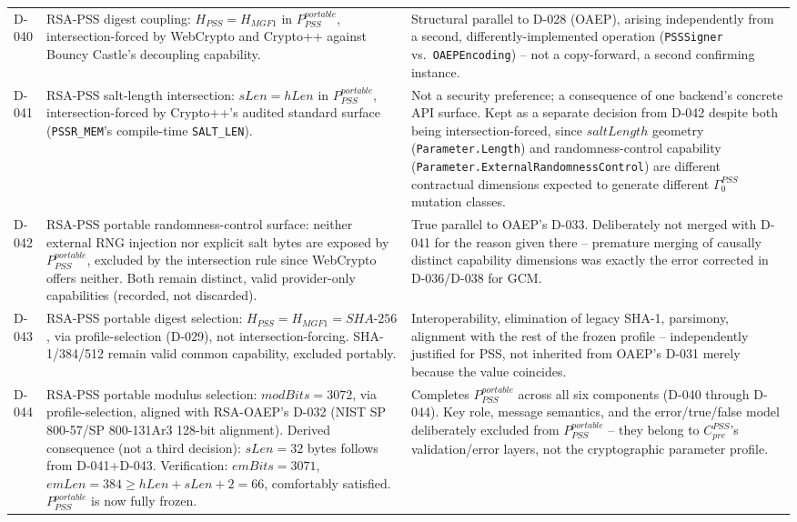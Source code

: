 \documentclass[11pt,a4paper]{article}
\begin{document}
\begin{longtable}{@{}L{0.28\textwidth}L{0.34\textwidth}L{0.30\textwidth}@{}}
D-040 & RSA-PSS digest coupling: $H_{PSS}=H_{MGF1}$ in $P_{PSS}^{portable}$, intersection-forced by WebCrypto and Crypto++ against Bouncy Castle's decoupling capability. & Structural parallel to D-028 (OAEP), arising independently from a second, differently-implemented operation (\texttt{PSSSigner} vs.\ \texttt{OAEPEncoding}) -- not a copy-forward, a second confirming instance.\\
D-041 & RSA-PSS salt-length intersection: $sLen=hLen$ in $P_{PSS}^{portable}$, intersection-forced by Crypto++'s audited standard surface (\texttt{PSSR\_MEM}'s compile-time \texttt{SALT\_LEN}). & Not a security preference; a consequence of one backend's concrete API surface. Kept as a separate decision from D-042 despite both being intersection-forced, since $saltLength$ geometry (\texttt{Parameter.Length}) and randomness-control capability (\texttt{Parameter.ExternalRandomnessControl}) are different contractual dimensions expected to generate different $\Gamma_0^{PSS}$ mutation classes.\\
D-042 & RSA-PSS portable randomness-control surface: neither external RNG injection nor explicit salt bytes are exposed by $P_{PSS}^{portable}$, excluded by the intersection rule since WebCrypto offers neither. Both remain distinct, valid provider-only capabilities (recorded, not discarded). & True parallel to OAEP's D-033. Deliberately not merged with D-041 for the reason given there -- premature merging of causally distinct capability dimensions was exactly the error corrected in D-036/D-038 for GCM.\\
D-043 & RSA-PSS portable digest selection: $H_{PSS}=H_{MGF1}=SHA\text{-}256$, via profile-selection (D-029), not intersection-forcing. SHA-1/384/512 remain valid common capability, excluded portably. & Interoperability, elimination of legacy SHA-1, parsimony, alignment with the rest of the frozen profile -- independently justified for PSS, not inherited from OAEP's D-031 merely because the value coincides.\\
D-044 & RSA-PSS portable modulus selection: $modBits=3072$, via profile-selection, aligned with RSA-OAEP's D-032 (NIST SP 800-57/SP 800-131Ar3 128-bit alignment). Derived consequence (not a third decision): $sLen=32$ bytes follows from D-041+D-043. Verification: $emBits=3071$, $emLen=384 \ge hLen+sLen+2=66$, comfortably satisfied. $P_{PSS}^{portable}$ is now fully frozen. & Completes $P_{PSS}^{portable}$ across all six components (D-040 through D-044). Key role, message semantics, and the error/true/false model deliberately excluded from $P_{PSS}^{portable}$ -- they belong to $C_{pre}^{PSS}$'s validation/error layers, not the cryptographic parameter profile.\\

\end{longtable}
\end{document}
